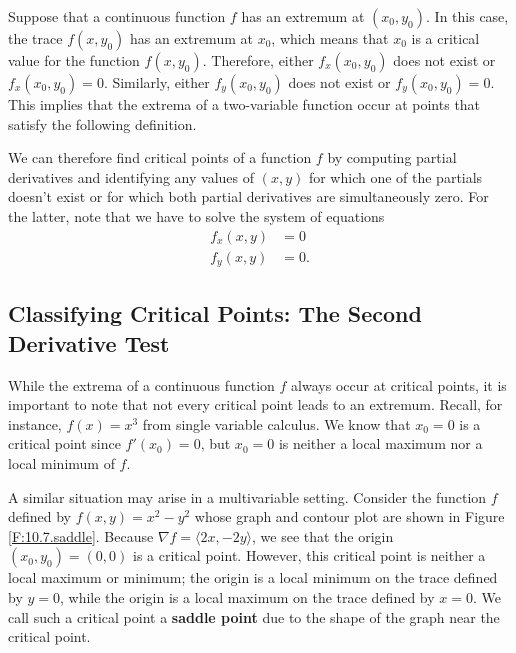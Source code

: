 Suppose that a continuous function $f$ has an extremum at $(x_0,y_0)$.  In this
case, the trace $f(x,y_0)$ has an extremum at $x_0$, which means
that $x_0$ is a critical value for the function $f(x,y_0)$.  Therefore,
either $f_x(x_0,y_0)$ does not exist or $f_x(x_0,y_0) = 0$.
Similarly, either $f_y(x_0,y_0)$ does not exist or $f_y(x_0,y_0) =
0$.  This implies that the extrema of a two-variable function occur at points that satisfy the following definition.

\vspace*{5pt}
\nin {}
\vspace*{5pt}

We can therefore find critical points of a function $f$ by computing partial derivatives and identifying any values of $(x,y)$ for which one of the partials doesn't exist or for which both partial derivatives are simultaneously zero.  For the latter, note that we have to solve the system of equations
\begin{align*}
f_x(x,y) &= 0 \\
f_y(x,y) & = 0.
\end{align*}



\subsection*{Classifying Critical Points: The Second Derivative Test}

While the extrema of a continuous function $f$ always occur at critical points,
 it is important to note that not every critical point leads to
an extremum.  Recall, for instance, $f(x) = x^3$ from single variable calculus. We know that $x_0=0$ is a critical point since $f'(x_0) = 0$, but $x_0 = 0$ is neither a local maximum nor a local minimum of $f$.  

A similar situation may arise in a multivariable setting.   Consider the function $f$ defined by $f(x,y) = x^2 - y^2$ whose graph and contour
plot are shown in Figure \ref{F:10.7.saddle}.  Because $\nabla f =
\langle 2x, -2y\rangle$, we see that the origin $(x_0,y_0)=(0,0)$ is a
critical point.  However, this critical point is neither a local
maximum or minimum; the origin
is a local minimum on the trace defined by $y=0$, while the origin is a local maximum on the trace
defined by $x=0$.  We call such a critical point a {\bf saddle point}
due to the shape of the graph near the critical point.

